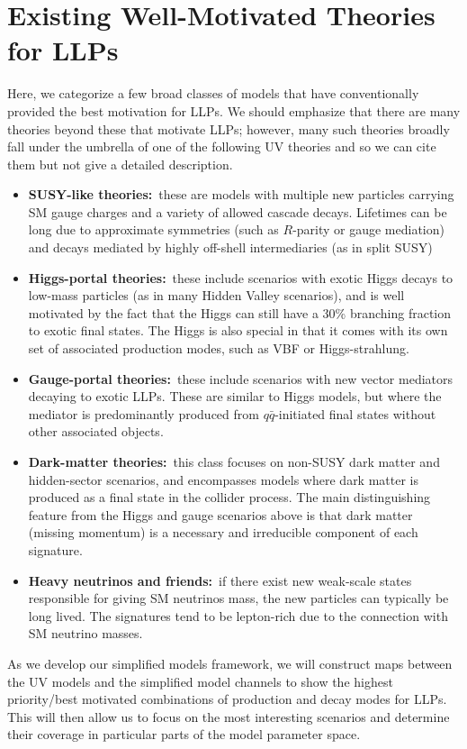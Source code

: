 \section{Existing Well-Motivated Theories for LLPs}
Here, we categorize a few broad classes of models that have conventionally provided the best motivation for LLPs. We should emphasize that there are many theories beyond these that motivate LLPs; however, many such theories broadly fall under the umbrella of one of the following UV theories and so we can cite them but not give a detailed description.
%
\begin{itemize}
\item {\bf SUSY-like theories:}~these are models with multiple new particles carrying SM gauge charges and a variety of allowed cascade decays. Lifetimes can be long due to approximate symmetries (such as $R$-parity or gauge mediation) and decays mediated by highly off-shell intermediaries (as in split SUSY)
\item {\bf Higgs-portal theories:}~these include scenarios with exotic Higgs decays to low-mass particles  (as in many Hidden Valley scenarios), and is well motivated by the fact that the Higgs can still have a 30\% branching fraction to exotic final states. The Higgs is also special in that it comes with its own set of associated production modes, such as VBF or Higgs-strahlung.
\item {\bf Gauge-portal theories:}~these include scenarios with new vector mediators decaying to exotic LLPs. These are similar to Higgs models, but where the mediator is predominantly produced from $q\bar{q}$-initiated final states without other associated objects.
\item {\bf Dark-matter theories:}~this class focuses on non-SUSY dark matter and hidden-sector scenarios, and encompasses models where dark matter is produced as a final state in the collider process. The main distinguishing feature from the Higgs and gauge scenarios above is that dark matter (missing momentum) is a necessary and irreducible component of each signature.
\item {\bf Heavy neutrinos and friends:}~if there exist new weak-scale states responsible for giving SM neutrinos mass, the new particles can typically be long lived. The signatures tend to be lepton-rich due to the connection with SM neutrino masses.
\end{itemize}
%
As we develop our simplified models framework, we will construct maps between the UV models and the simplified model channels to show the highest priority/best motivated combinations of production and decay modes for LLPs. This will then allow us to focus on the most interesting scenarios and determine their coverage in particular parts of the model parameter space.

